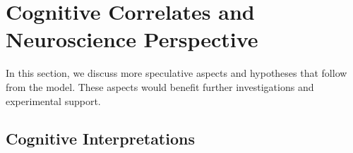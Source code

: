 \documentclass{frontiersSCNS} %
\begin{document}
%
%
%
%
%
%
%
%
%

\section{Cognitive Correlates and Neuroscience Perspective}
\label{sec:cognition-neuroscience}

In this section, we discuss more speculative aspects and hypotheses that follow
from the model. These aspects would benefit further investigations and
experimental support.

\subsection{Cognitive Interpretations}
\label{sec:cognitive-model}
\end{document}
